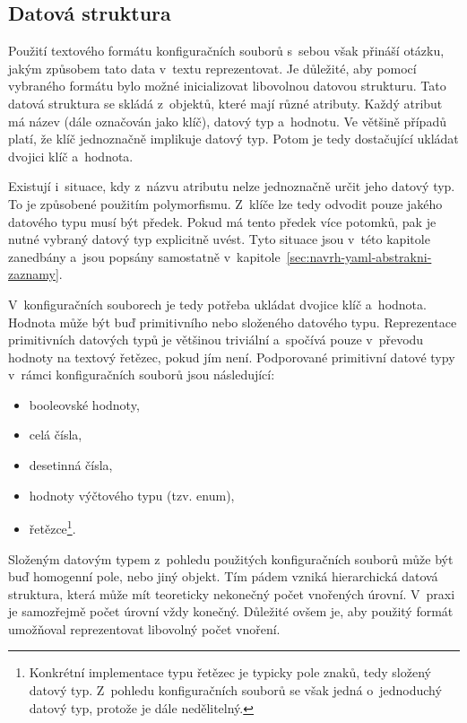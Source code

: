 \documentclass[FM,bw,DP]{tulthesis}
\begin{document}
\subsection{Datová struktura}
\label{sec:datova-struktura}
Použití textového formátu konfiguračních souborů s~sebou však přináší otázku, jakým způsobem tato data v~textu reprezentovat. Je důležité, aby pomocí vybraného formátu bylo možné inicializovat libovolnou datovou strukturu. Tato datová struktura se skládá z~objektů, které mají různé atributy. Každý atribut má název (dále označován jako klíč), datový typ a~hodnotu. Ve většině případů platí, že klíč jednoznačně implikuje datový typ. Potom je tedy dostačující ukládat dvojici klíč a~hodnota.

Existují i~situace, kdy z~názvu atributu nelze jednoznačně určit jeho datový typ. To je způsobené použitím polymorfismu. Z~klíče lze tedy odvodit pouze jakého datového typu musí být předek. Pokud má tento předek více potomků, pak je nutné vybraný datový typ explicitně uvést. Tyto situace jsou v~této kapitole zanedbány a~jsou popsány samostatně v~kapitole~\ref{sec:navrh-yaml-abstrakni-zaznamy}.

V~konfiguračních souborech je tedy potřeba ukládat dvojice klíč a~hodnota. Hodnota může být buď primitivního nebo složeného datového typu. Reprezentace primitivních datových typů je většinou triviální a~spočívá pouze v~převodu hodnoty na textový řetězec, pokud jím není. Podporované primitivní datové typy v~rámci konfiguračních souborů jsou následující:

\begin{itemize}
	\item booleovské hodnoty,
	\item celá čísla,
	\item desetinná čísla,
	\item hodnoty výčtového typu (tzv. enum),
	\item řetězce\footnote{Konkrétní implementace typu řetězec je typicky pole znaků, tedy složený datový typ. Z~pohledu konfiguračních souborů se však jedná o~jednoduchý datový typ, protože je dále nedělitelný.}.
\end{itemize}

Složeným datovým typem z~pohledu použitých konfiguračních souborů může být buď homogenní pole, nebo jiný objekt. Tím pádem vzniká hierarchická datová struktura, která může mít teoreticky nekonečný počet vnořených úrovní. V~praxi je samozřejmě počet úrovní vždy konečný. Důležité ovšem je, aby použitý formát umožňoval reprezentovat libovolný počet vnoření.
\end{document}

